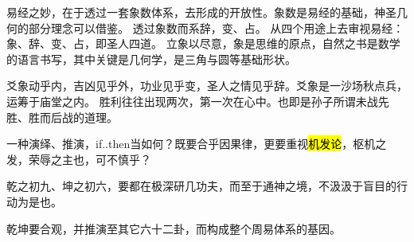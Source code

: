 易经之妙，在于透过一套象数体系，去形成的开放性。象数是易经的基础，神圣几何的部分理念可以借鉴。
透过象数而系辞，变、占。 从四个用途上去审视易经：象、辞、变、占，即圣人四道。
立象以尽意，象是思维的原点，自然之书是数学的语言书写，其中关键是几何学，是三角与圆等基础形状。

爻象动乎内，吉凶见乎外，功业见乎变，圣人之情见乎辞。爻象是一沙场秋点兵，运筹于庙堂之内。
胜利往往出现两次，第一次在心中。也即是孙子所谓未战先胜、胜而后战的道理。

一种演绎、推演，if..then当如何？既要合乎因果律，更要重视\hl{机发论}，枢机之发，荣辱之主也，可不慎乎？

乾之初九、坤之初六，要都在极深研几功夫，而至于通神之境，不汲汲于盲目的行动为是也。

乾坤要合观，并推演至其它六十二卦，而构成整个周易体系的基因。
